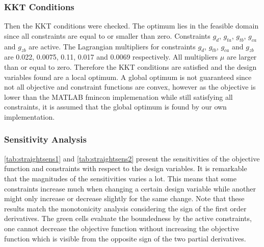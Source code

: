 \subsubsection{KKT Conditions}
Then the KKT conditions were checked. The optimum lies in the feasible domain since all constraints are equal to or smaller than zero. Constraints $g_d$, $g_{ta}$, $g_{tb}$, $g_{ca}$ and $g_{zb}$ are active. The Lagrangian multipliers for constraints $g_d$, $g_{tb}$, $g_{ca}$ and $g_{zb}$ are 0.022, 0.0075, 0.11, 0.017 and 0.0069 respectively.  All multipliers $\mu$ are larger than or equal to zero. Therefore the KKT conditions are satisfied and the design variables found are a local optimum. A global optimum is not guaranteed since not all objective and constraint functions are convex, however as the objective is lower than the MATLAB fmincon implemenation while still satisfying all constraints, it is assumed that the global optimum is found by our own implementation.


\subsubsection{Sensitivity Analysis}

\autoref{tab:straightsens1} and \ref{tab:straightsens2} present the sensitivities of the objective function and constraints with respect to the design variables. It is remarkable that the magnitudes of the sensitivities varies a lot. This means that some constraints increase much when changing a certain design variable while another might only increase or decrease slightly for the same change.  Note that these results match the monotonicity analysis considering the sign of the first order derivatives. The green cells evaluate the boundedness by the active constraints, one cannot decrease the objective function without increasing the objective function which is visible from the opposite sign of the two partial derivatives.

